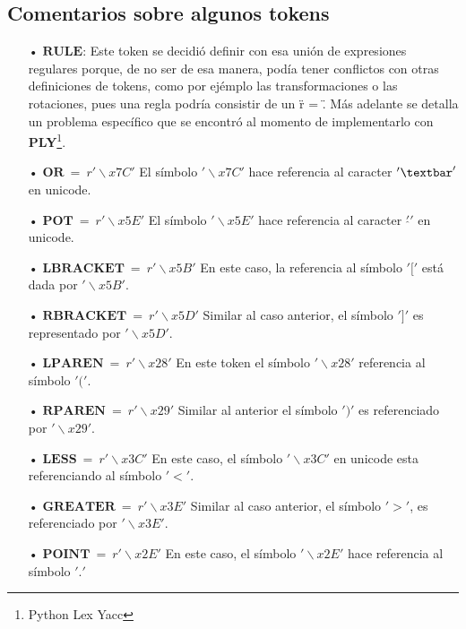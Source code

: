 \subsection{Comentarios sobre algunos tokens}
\begin{itemize}
\item[•] $\mathbf{RULE}$: Este token se decidi\'o definir con esa uni\'on de expresiones regulares porque, de no ser de esa manera, pod\'ia tener conflictos con otras definiciones de tokens, como por ej\'emplo las transformaciones o las rotaciones, pues una regla podr\'ia consistir de un \" r = \". M\'as adelante se detalla un problema espec\'ifico que se encontr\'o al momento de implementarlo con \textbf{PLY}\footnote{Python Lex Yacc}. 

\item[•] $\mathbf{OR}\ =\ r'\backslash x7C'$ El s\'imbolo $'\backslash x7C'$ hace referencia al caracter $' \textbar '$ en unicode.
\item[•] $\mathbf{POT}\ =\ r'\backslash x5E'$ El s\'imbolo $'\backslash x5E'$ hace referencia al caracter $' \widehat{} '$ en unicode.
\item[•] $\mathbf{LBRACKET}\ =\ r'\backslash x5B'$ En este caso, la referencia al s\'imbolo $'['$ est\'a dada por $'\backslash x5B'$. 
\item[•] $\mathbf{RBRACKET}\ =\ r'\backslash x5D'$ Similar al caso anterior, el s\'imbolo $']'$ es representado por $'\backslash x5D'$.
\item[•] $\mathbf{LPAREN}\ =\ r'\backslash x28'$ En este token el s\'imbolo $'\backslash x28'$ referencia al s\'imbolo $'('$. 
\item[•] $\mathbf{RPAREN}\ =\ r'\backslash x29'$ Similar al anterior el s\'imbolo $')'$ es referenciado por $'\backslash x29'$. 
\item[•] $\mathbf{LESS}\ =\ r'\backslash x3C'$ En este caso, el s\'imbolo $'\backslash x3C'$ en unicode esta referenciando al s\'imbolo $'<'$. 
\item[•] $\mathbf{GREATER}\ =\ r'\backslash x3E'$ Similar al caso anterior, el s\'imbolo $'>'$, es referenciado por $'\backslash x3E'$.
\item[•] $\mathbf{POINT}\ =\ r'\backslash x2E'$ En este caso, el s\'imbolo $'\backslash x2E'$ hace referencia al s\'imbolo $'.'$

\end{itemize}
